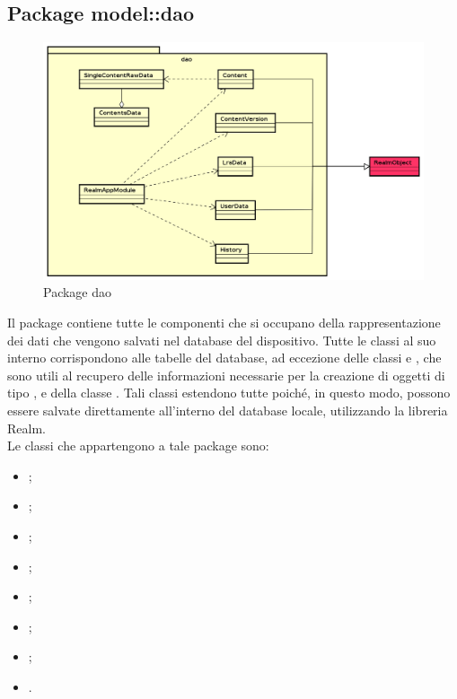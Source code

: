 \documentclass[../Tesi.tex]{subfiles}
\begin{document}
	\subsection{Package model::dao}
		\begin{figure}[H]
			\centering
			\includegraphics[scale=0.5]{images/package_diagrams/dao}
				\caption{Package dao}
		\end{figure}
		Il package  contiene tutte le componenti che si occupano della rappresentazione dei dati che vengono salvati nel database del dispositivo. Tutte le classi al suo interno corrispondono alle tabelle del database, ad eccezione delle classi  e , che sono utili al recupero delle informazioni necessarie per la creazione di oggetti di tipo , e della classe . Tali classi estendono tutte  poiché, in questo modo, possono essere salvate direttamente all'interno del database locale, utilizzando la libreria Realm. \\
		Le classi che appartengono a tale package sono:
		\begin{itemize}
			\item {};
			\item {};
			\item {};
			\item {};
			\item {};
			\item {};
			\item {};
			\item {}.
		\end{itemize}
\end{document}
